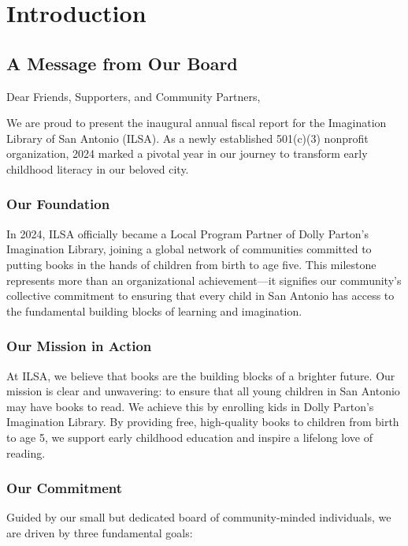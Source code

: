 ﻿%
\chapter{Introduction}  \newpage

\section*{A Message from Our Board}

\vspace{1em}
Dear Friends, Supporters, and Community Partners,

We are proud to present the inaugural annual fiscal report for the Imagination Library of San Antonio (ILSA). As a newly established 501(c)(3) nonprofit organization, 2024 marked a pivotal year in our journey to transform early childhood literacy in our beloved city.

\subsection*{Our Foundation}

In 2024, ILSA officially became a Local Program Partner of Dolly Parton's Imagination Library, joining a global network of communities committed to putting books in the hands of children from birth to age five. This milestone represents more than an organizational achievement---it signifies our community's collective commitment to ensuring that every child in San Antonio has access to the fundamental building blocks of learning and imagination.

\subsection*{Our Mission in Action}
At ILSA, we believe that books are the building blocks of a brighter future. Our mission is clear and unwavering: to ensure that all young children in San Antonio may have books to read. We achieve this by enrolling kids in Dolly Parton's Imagination Library. By providing free, high-quality books to children from birth to age 5, we support early childhood education and inspire a lifelong love of reading.

\subsection*{Our Commitment}
Guided by our small but dedicated board of community-minded individuals, we are driven by three fundamental goals:

